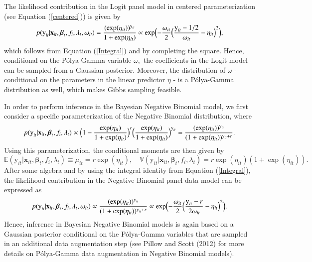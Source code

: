 \documentclass[a4paper, preprint, 3p,
authoryear]{elsarticle} %
\begin{document}
The likelihood contribution in the Logit panel model in centered
parameterization (see Equation (\ref{centered})) is given by
\begin{equation*}
 p(\text{y}_{it}|\textbf{x}_{it},\boldsymbol{\beta}_t,f_i,\lambda_t,\omega_{it}) = \frac{(\exp(\eta_{it}))^{\text{y}_{it}}}{1+\exp(\eta_{it})} \propto  \exp\Bigl(-\frac{\omega_{it}}{2}\Bigl(\frac{\text{y}_{it}-1/2}{\omega_{it}}-\eta_{it}\Bigr)^2\Bigr),
\end{equation*} which follows from Equation (\ref{Integral}) and by
completing the square. Hence, conditional on the Pólya-Gamma variable
\(\omega,\) the coefficients in the Logit model can be sampled from a
Gaussian posterior. Moreover, the distribution of \(\omega\) -
conditional on the parameters in the linear predictor \(\eta\) - is a
Pólya-Gamma distribution as well, which makes Gibbs sampling feasible.

In order to perform inference in the Bayesian Negative Binomial model,
we first consider a specific parameterization of the Negative Binomial
distribution, where \begin{equation*}
 p(\text{y}_{it}|\textbf{x}_{it},\boldsymbol{\beta}_t,f_i,\lambda_t) \propto \Bigl(1-\frac{\exp(\eta_{it})}{1+\exp(\eta_{it})}\Bigr)^r \Bigl(\frac{\exp(\eta_{it})}{1+\exp(\eta_{it})}\Bigr)^{\text{y}_{it}} = \frac{(\exp(\eta_{it}))^{\text{y}_{it}}}{(1+\exp(\eta_{it}))^{\text{y}_{it} + r}}.
\end{equation*} Using this parameterization, the conditional moments are
then given by \begin{equation*}
 \mathbb{E}(\text{y}_{it}|\textbf{x}_{it},\boldsymbol{\beta}_t,f_i,\lambda_t) \equiv \mu_{it} = r  \exp(\eta_{it}), \quad \mathbb{V}(\text{y}_{it}|\textbf{x}_{it},\boldsymbol{\beta}_t,f_i,\lambda_t) = r \exp(\eta_{it}) (1 + \exp(\eta_{it})).
\end{equation*} After some algebra and by using the integral identity
from Equation (\ref{Integral}), the likelihood contribution in the
Negative Binomial panel data model can be expressed as \begin{equation*}
 p(\text{y}_{it}|\textbf{x}_{it},\boldsymbol{\beta}_t,f_i,\lambda_t, \omega_{it}) \propto 
 \frac{(\exp(\eta_{it}))^{\text{y}_{it}}}{(1+\exp(\eta_{it}))^{\text{y}_{it} + r}} \propto \exp\Bigl(-\frac{\omega_{it}}{2}\Bigl(\frac{\text{y}_{it}-r}{2\omega_{it}} - \eta_{it}\Bigr)^2\Bigr).
\end{equation*} Hence, inference in Bayesian Negative Binomial models is
again based on a Gaussian posterior conditional on the Pólya-Gamma
variables that are sampled in an additional data augmentation step (see
Pillow and Scott (2012) for more details on Pólya-Gamma data
augmentation in Negative Binomial models).
\end{document}
